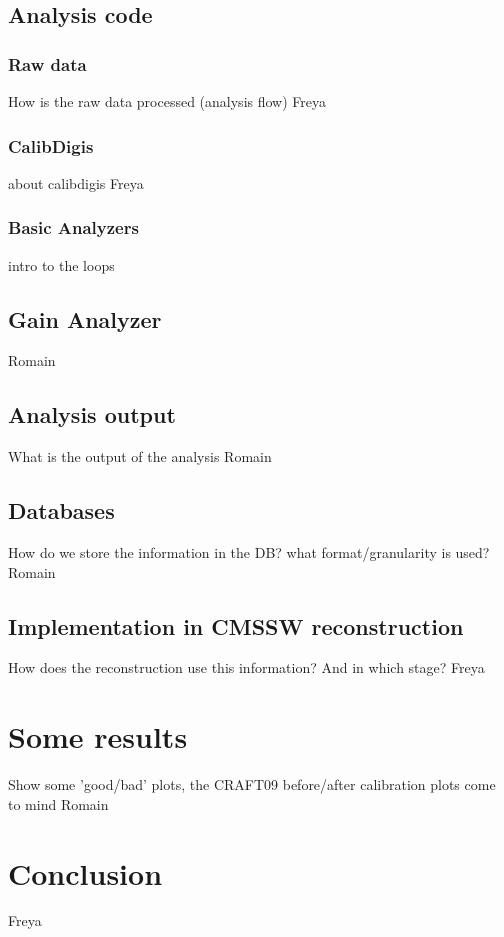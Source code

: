 \subsection{Analysis code}
\subsubsection*{Raw data}
How is the raw data processed (analysis flow)
Freya
\subsubsection*{CalibDigis}
about calibdigis 
Freya
\subsubsection*{Basic Analyzers}
intro to the loops

\subsection{Gain Analyzer}
Romain

\subsection{Analysis output}
What is the output of the analysis
Romain
\subsection{Databases}
How do we store the information in the DB? what format/granularity is used? 
Romain
\subsection{Implementation in CMSSW reconstruction}
How does the reconstruction use this information? And in which stage?
Freya
\section{Some results}
Show some 'good/bad' plots, the CRAFT09 before/after calibration plots come to mind
Romain
\section{Conclusion}
Freya

\clearpage
\appendix

